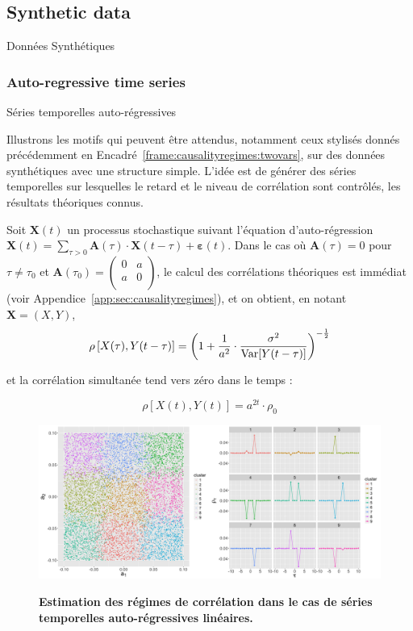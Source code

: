 \subsection{Synthetic data}{Données Synthétiques}

\subsubsection{Auto-regressive time series}{Séries temporelles auto-régressives}

Illustrons les motifs qui peuvent être attendus, notamment ceux stylisés donnés précédemment en Encadré~\ref{frame:causalityregimes:twovars}, sur des données synthétiques avec une structure simple. L'idée est de générer des séries temporelles sur lesquelles le retard et le niveau de corrélation sont contrôlés, les résultats théoriques connus.


Soit $\mathbf{X}(t)$ un processus stochastique suivant l'équation d'auto-régression $\mathbf{X}(t) = \sum_{\tau > 0} \mathbf{A}(\tau) \cdot \mathbf{X}(t - \tau ) + \mathbf{\varepsilon}(t)$. Dans le cas où $\mathbf{A}(\tau) = 0$ pour $\tau \neq \tau_0$ et $\mathbf{A}(\tau_0) = \left( {\begin{array}{cc} 0 & a \\ a & 0 \\ \end{array}} \right)$, le calcul des corrélations théoriques est immédiat (voir Appendice~\ref{app:sec:causalityregimes}), et on obtient, en notant $\mathbf{X} = (X,Y)$,
\[
\rho\left[X(\tau),Y(t-\tau)\right] = \left(1 + \frac{1}{a^2}\cdot \frac{\sigma^2}{\operatorname{Var}\!\left[Y(t-\tau)\right]}\right)^{-\frac{1}{2}}
\]

et la corrélation simultanée tend vers zéro dans le temps :

\[
\rho\left[X(t),Y(t)\right] = a^{2t} \cdot \rho_0
\]


\begin{figure}
	\includegraphics[width=\linewidth]{Figures/Final/4-2-2-fig-causalityregimes-arma.jpg}
	\caption{}{\textbf{Estimation des régimes de corrélation dans le cas de séries temporelles auto-régressives linéaires.}\label{fig:causalityregimes:arma}}
\end{figure}



